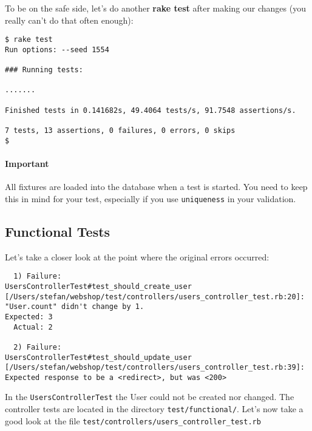 \documentclass[a4paper]{book}
\newcounter{tab}[chapter]
\begin{document}
To be on the safe side, let's do another \textbf{rake test} after making our changes (you really can't do that often enough):

\begin{shaded}\begin{verbatim}
$ rake test
Run options: --seed 1554

### Running tests:

.......

Finished tests in 0.141682s, 49.4064 tests/s, 91.7548 assertions/s.

7 tests, 13 assertions, 0 failures, 0 errors, 0 skips
$
\end{verbatim}\end{shaded}

\paragraph{Important}\label{important-11}

All fixtures are loaded into the database when a test is started. You need to keep this in mind for your test, especially if you use \texttt{uniqueness} in your validation.

\subsection{Functional Tests}\label{functional-tests}

Let's take a closer look at the point where the original errors occurred:

\begin{shaded}\begin{verbatim}
  1) Failure:
UsersControllerTest#test_should_create_user [/Users/stefan/webshop/test/controllers/users_controller_test.rb:20]:
"User.count" didn't change by 1.
Expected: 3
  Actual: 2

  2) Failure:
UsersControllerTest#test_should_update_user [/Users/stefan/webshop/test/controllers/users_controller_test.rb:39]:
Expected response to be a <redirect>, but was <200>
\end{verbatim}\end{shaded}

In the \texttt{UsersControllerTest} the User could not be created nor changed. The controller tests are located in the directory \texttt{test/functional/}. Let's now take a good look at the file \texttt{test/controllers/users\_controller\_test.rb}
\end{document}
